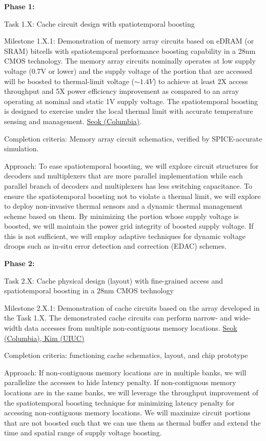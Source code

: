 

\noindent
\textbf{Phase 1:}

Task 1.X: Cache circuit design with spatiotemporal boosting

Milestone 1.X.1: Demonstration of memory array circuits based on eDRAM (or SRAM) bitcells with spatiotemporal performance boosting capability in a 28nm CMOS technology. The memory array circuits nominally operates at low supply voltage (0.7V or lower) and the supply voltage of the portion that are accessed will be boosted to thermal-limit voltage ($\sim 1.4V$) to achieve at least 2X access throughput and 5X power efficiency improvement as compared to an array operating at nominal and static 1V supply voltage. The spatiotemporal boosting is designed to exercise under the local thermal limit with accurate temperature sensing and management. \underline{Seok (Columbia)}. 

   Completion criteria: Memory array circuit schematics, verified by SPICE-accurate simulation. 

   Approach: To ease spatiotemporal boosting, we will explore circuit structures for decoders and multiplexers that are more parallel implementation while each parallel branch of decoders and multiplexers has less switching capacitance. To ensure the spatiotemporal boosting not to violate a thermal limit, we will explore to deploy non-invasive thermal sensors and a dynamic thermal management scheme based on them. By minimizing the portion whose supply voltage is boosted, we will maintain the power grid integrity of boosted supply voltage. If this is not sufficient, we will employ adaptive techniques for dynamic voltage droops such as in-situ error detection and correction (EDAC) schemes. 

\noindent
\textbf{Phase 2:}

Task 2.X: Cache physical design (layout) with fine-grained access and spatiotemporal boosting in a 28nm CMOS technology

Milestone 2.X.1: Demonstration of cache circuits based on the array developed in the Task 1.X. The demonstrated cache circuits can perform narrow- and wide-width data accesses from multiple non-contiguous memory locations. \underline{Seok (Columbia), Kim (UIUC)}

   Completion criteria: functioning cache schematics, layout, and chip prototype

   Approach: If non-contiguous memory locations are in multiple banks, we will parallelize the accesses to hide latency penalty. If non-contiguous memory locations are in the same banks, we will leverage the throughput improvement of the spatiotemporal boosting technique for minimizing latency penalty for accessing non-contiguous memory locations. We will maximize circuit portions that are not boosted such that we can use them as thermal buffer and extend the time and spatial range of supply voltage boosting. 

